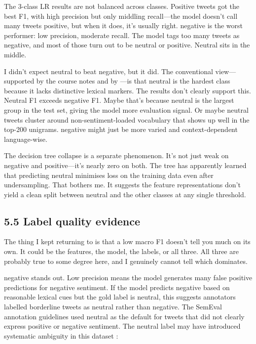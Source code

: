 \documentclass[12pt]{article}
\begin{document}
The 3-class LR results are not balanced across classes.
Positive tweets got the best F1, with high precision but only middling recall---the model doesn't call many tweets positive, but when it does, it's usually right.
negative is the worst performer: low precision, moderate recall.
The model tags too many tweets as negative, and most of those turn out to be neutral or positive.
Neutral sits in the middle.

I didn't expect neutral to beat negative, but it did.
The conventional view---supported by the course notes and by \citet{kenyondean2018sentiment}---is that neutral is the hardest class because it lacks distinctive lexical markers.
The results don't clearly support this.
Neutral F1 exceeds negative F1.
Maybe that's because neutral is the largest group in the test set, giving the model more evaluation signal.
Or maybe neutral tweets cluster around non-sentiment-loaded vocabulary that shows up well in the top-200 unigrams.
negative might just be more varied and context-dependent language-wise.

The decision tree collapse is a separate phenomenon.
It's not just weak on negative and positive---it's nearly zero on both.
The tree has apparently learned that predicting neutral minimises loss on the training data even after undersampling.
That bothers me.
It suggests the feature representations don't yield a clean split between neutral and the other classes at any single threshold.



\subsection*{5.5 Label quality evidence}



The thing I kept returning to is that a low macro F1 doesn't tell you much on its own.
It could be the features, the model, the labels, or all three.
All three are probably true to some degree here, and I genuinely cannot tell which dominates.

negative stands out. Low precision means the model generates many false positive predictions for negative sentiment. If the model predicts negative based on reasonable lexical cues but the gold label is neutral, this suggests annotators labelled borderline tweets as neutral rather than negative. The SemEval annotation guidelines used neutral as the default for tweets that did not clearly express positive or negative sentiment. The neutral label may have introduced systematic ambiguity in this dataset \citep{kenyondean2018sentiment}:
\end{document}
